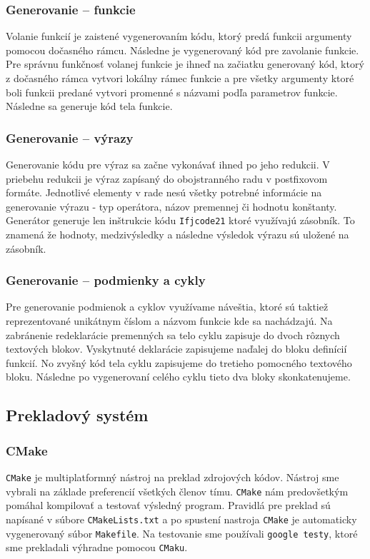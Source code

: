 \documentclass[a4paper, 11pt]{article}
\begin{document}
    \subsubsection{Generovanie -- funkcie}
    Volanie funkcií je zaistené vygenerovaním kódu, ktorý predá funkcii argumenty pomocou dočasného rámcu. Následne
    je vygenerovaný kód pre zavolanie funkcie. Pre správnu funkčnosť volanej funkcie je ihneď na začiatku generovaný kód,
    ktorý z dočasného rámca vytvori lokálny rámec funkcie a pre všetky argumenty ktoré boli funkcii predané vytvori
    promenné s názvami podľa parametrov funkcie. Následne sa generuje kód tela funkcie.

    \subsubsection{Generovanie -- výrazy}
    Generovanie kódu pre výraz sa začne vykonávať ihned po jeho redukcii. V priebehu redukcii je výraz zapísaný do obojstranného radu
    v postfixovom formáte. Jednotlivé elementy v rade nesú všetky potrebné
    informácie na generovanie výrazu - typ operátora, názov premennej či hodnotu konštanty. Generátor generuje len inštrukcie
    kódu \texttt{Ifjcode21} ktoré využívajú zásobník. To znamená že hodnoty, medzivýsledky a následne výsledok výrazu sú
    uložené na zásobník.

    \subsubsection{Generovanie -- podmienky a cykly}
    Pre generovanie podmienok a cyklov využívame náveštia, ktoré sú taktiež reprezentované unikátnym číslom a
    názvom funkcie kde sa nachádzajú. Na zabránenie redeklarácie premenných sa telo cyklu zapisuje do dvoch rôznych textových
    blokov. Vyskytnuté deklarácie zapisujeme naďalej do bloku definícií funkcií. No zvyšný kód tela cyklu zapisujeme do
    tretieho pomocného textového bloku. Následne po vygenerovaní celého cyklu tieto dva bloky skonkatenujeme.

    \subsection{Prekladový systém}
    \subsubsection{CMake}
    \texttt{CMake} je multiplatformný nástroj na preklad zdrojových kódov. Nástroj sme vybrali na základe preferencií všetkých
    členov tímu. \texttt{CMake} nám predovšetkým pomáhal kompilovať a testovať výsledný program. Pravidlá pre preklad sú napísané v súbore
    \texttt{CMakeLists.txt} a po spustení nastroja \texttt{CMake} je automaticky vygenerovaný súbor \texttt{Makefile}.
    Na testovanie sme používali \texttt{google testy}, ktoré sme prekladali výhradne pomocou \texttt{CMaku}.
\end{document}
